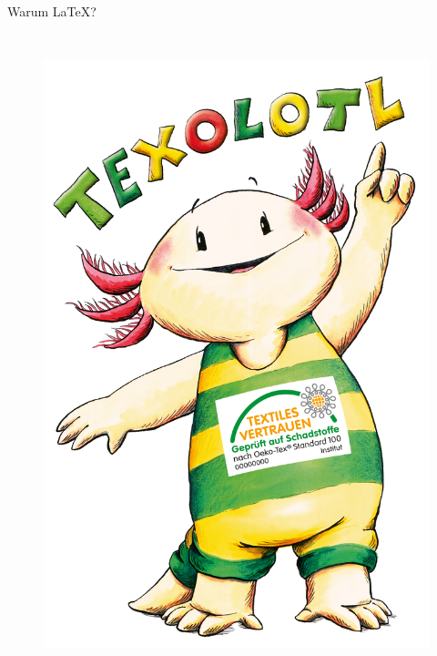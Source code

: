 \documentclass["WS\space 16-17\space -\space LaTeX-Kurs\space -\space Praesentation\space -\space 1.tex"]{subfiles}
\begin{document}
\begin{frame}[c]{Warum \LaTeX?}

  \begin{columns}[t]

    \begin{figure}
      \includegraphics[width=0.6\linewidth]{img/Texolotl.jpg}      
      \footnotemark[1]
      \label{fig:texolotl}
    \end{figure}


\end{columns}
\end{frame}
\end{document}
